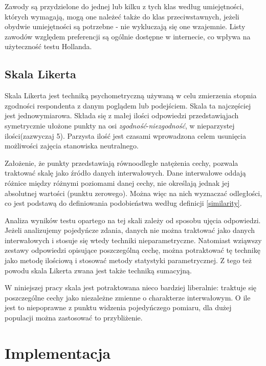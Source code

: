 \documentclass[12pt,a4paper,oneside]{report} %
\begin{document}
Zawody są przydzielone do jednej lub kilku z tych klas według umiejętności, których wymagają, mogą one należeć także do klas przeciwstawnych, jeżeli obydwie umiejętności są potrzebne - nie wykluczają się one wzajemnie. Listy zawodów względem preferencji są ogólnie dostępne w internecie, co wpływa na użyteczność testu Hollanda. \par

\section{Skala Likerta}

Skala Likerta jest techniką psychometryczną używaną w celu zmierzenia stopnia zgodności respondenta z danym poglądem lub podejściem. Skala ta najczęściej jest jednowymiarowa. Składa się z małej ilości odpowiedzi przedstawiąjach symetrycznie ułożone punkty na osi \emph{zgodność}-\emph{niezgodność}, w nieparzystej ilości(zazwyczaj 5). Parzysta ilość jest czasami wprowadzona celem usunięcia możliwości zajęcia stanowiska neutralnego. \par

Założenie, że punkty przedstawiają równoodległe natężenia cechy, pozwala traktować skalę jako źródło danych interwałowych. Dane interwałowe oddają różnice między różnymi poziomami danej cechy, nie określają jednak jej absolutnej wartości (punktu zerowego). \cite{bertram} Można więc na nich wyznaczać odległości, co jest podstawą do definiowania podobieństwa według definicji \ref{similarity}.\par

Analiza wyników testu opartego na tej skali zależy od sposobu ujęcia odpowiedzi. Jeżeli analizujemy pojedyńcze zdania, danych nie można traktować jako danych interwałowych i stosuje się wtedy techniki nieparametryczne. Natomiast wziąwszy zestawy odpowiedzi opisujące poszczególną cechę, można potraktować tę technikę jako metodę ilościową i stosować metody statystyki parametrycznej. \cite{joe} Z tego też powodu skala Likerta zwana jest także techniką sumacyjną. \par

W niniejszej pracy skala jest potraktowana nieco bardziej liberalnie: traktuje się poszczególne cechy jako niezależne zmienne o charakterze interwałowym. O ile jest to niepoprawne z punktu widzenia pojedyńczego pomiaru, dla dużej populacji można zastosować to przybliżenie. \par




\chapter{Implementacja}
\end{document}

